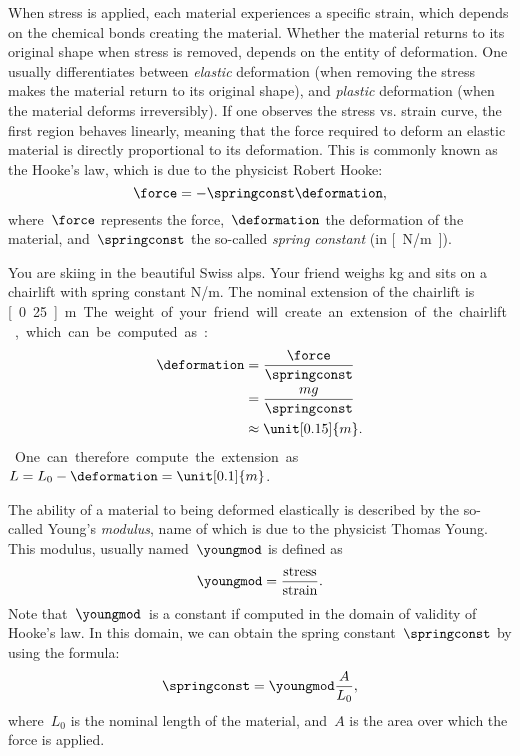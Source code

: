 When stress is applied, each material experiences a specific strain, which depends on the chemical bonds creating the material. Whether the material returns to its original shape when stress is removed, depends on the entity of deformation.
One usually differentiates between \emph{elastic} deformation (when removing the stress makes the material return to its original shape), and \emph{plastic} deformation (when the material deforms irreversibly).
If one observes the stress vs. strain curve, the first region behaves linearly, meaning that the force required to deform an elastic material is directly proportional to its deformation.
This is commonly known as the Hooke's law, which is due to the physicist Robert Hooke:
\begin{equation*}
  \force=-\springconst \deformation,
\end{equation*}
where~$\force$ represents the force,~$\deformation$ the deformation of the material, and~$\springconst$ the so-called \emph{spring constant} (in \unit[]{[N/m]}).


\begin{example}
  You are skiing in the beautiful Swiss alps. Your friend weighs \unit[100]{kg} and sits on a chairlift with spring constant \unit[4,000]{N/m}. The nominal extension of the chairlift is \unit[0.25]{m}. The weight of your friend will create an extension of the chairlift, which can be computed as:
  \begin{equation*}
  \begin{aligned}
    \deformation &=\frac{\force}{\springconst}\\
    &=\frac{mg}{\springconst}\\
    &\approx \unit[0.15]{m}.
  \end{aligned}
  \end{equation*}
  One can therefore compute the extension as~$L=L_0-\deformation=\unit[0.1]{m}$.
\end{example}

The ability of a material to being deformed elastically is described by the so-called Young's \emph{modulus}, name of which is due to the physicist Thomas Young. This modulus, usually named~$\youngmod$ is defined as
\begin{equation*}
  \youngmod=\frac{\text{stress}}{\text{strain}}.
\end{equation*}
Note that~$\youngmod$~is a constant if computed in the domain of validity of Hooke's law. In this domain, we can obtain the spring constant~$\springconst$ by using the formula:
\begin{equation*}
  \springconst=\youngmod \frac{A}{L_0},
\end{equation*}
where~$L_0$ is the nominal length of the material, and~$A$ is the area over which the force is applied.

